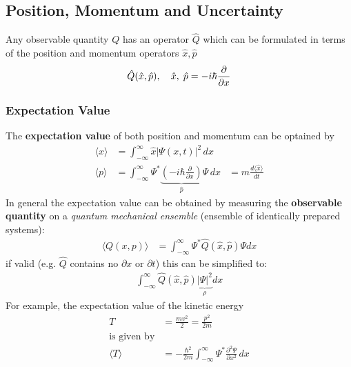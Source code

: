 \subsection{Position, Momentum and Uncertainty}
Any observable quantity $Q$ has an operator $\hat{Q}$ which can be formulated in terms of the position and momentum operators $\hat{x}, \hat{p}$
\begin{equation*}
    \hat{Q}(\hat{x},\hat{p}), \hspace*{10pt} \hat{x},\; \hat{p}=-i\hbar \frac{\partial}{\partial x}
\end{equation*}


\subsubsection{Expectation Value}
The \textbf{expectation value} of both position and momentum can be optained by
\begin{align*}
    \langle x \rangle & = \int_{-\infty}^{\infty} \hat{x} |\Psi(x,t)|^2 \, dx                                                                                                         \\
    \langle p \rangle & = \int_{-\infty}^{\infty} \Psi^* \underbrace{\left(-i\hbar \frac{\partial}{\partial x}\right)}_{\hat{p}} \Psi \, dx & = m \frac{d\langle \hat{x} \rangle}{dt}
\end{align*}
In general the expectation value can be obtained by measuring the \textbf{observable quantity} on a \textit{quantum mechanical ensemble} (ensemble of identically prepared systems):
\begin{align*}
    \langle Q(x,p)\rangle & = \int_{-\infty}^{\infty}\Psi^*\hat{Q}(\hat{x},\hat{p})\Psi dx
\end{align*}
if valid (e.g. $\hat{Q}$ contains no $\partial{x}$ or $\partial{t}$) this can be simplified to:\\
\begin{align*}
    \int_{-\infty}^{\infty}\hat{Q}(\hat{x},\hat{p}) \underbrace{|\Psi|^2}_{\rho} dx
\end{align*}
For example, the expectation value of the kinetic energy
\begin{align*}
    T                 & =\frac{mv^2}{2}=\frac{p^2}{2m}                                                             \\
    \text{is given by}                                                                                             \\
    \langle T \rangle & = -\frac{\hbar^2}{2m}\int_{-\infty}^{\infty}\Psi^*\frac{\partial^2\Psi}{\partial x^2} \,dx
\end{align*}

